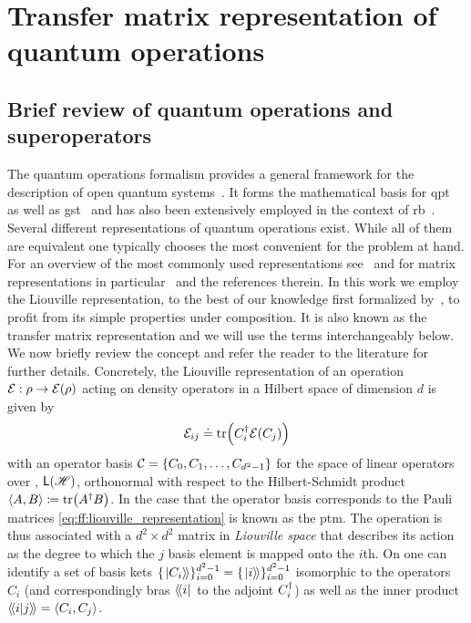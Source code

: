 \section{Transfer matrix representation of quantum operations}\label{sec:ff:theory:transfer_matrix}
\subsection{Brief review of quantum operations and superoperators}
The quantum operations formalism provides a general framework for the description of open quantum systems~\cite{Kraus1983,Nielsen2011}.
It forms the mathematical basis for \gls{qpt}~\cite{Chuang1997,Poyatos1997} as well as \gls{gst}~\cite{Blume-Kohout2013,Greenbaum2015} and has also been extensively employed in the context of \gls{rb}~\cite{Magesan2011,Kimmel2014}.
Several different representations of quantum operations exist.
While all of them are equivalent one typically chooses the most convenient for the problem at hand.
For an overview of the most commonly used representations see~ and for matrix representations in particular~ and the references therein.
In this work we employ the Liouville representation, to the best of our knowledge first formalized by~\citeauthor{Fano1957}, to profit from its simple properties under composition.
It is also known as the transfer matrix representation and we will use the terms interchangeably below.
We now briefly review the concept and refer the reader to the literature for further details.
Concretely, the Liouville representation of an operation $\mathcal{E}: \rho\rightarrow\mathcal{E}(\rho)$ acting on density operators in a Hilbert space \Hspace of dimension $d$ is given by
\begin{equation}\label{eq:ff:liouville_representation}
    \mathcal{E}_{ij}\doteq\tr(C_i^\dagger\mathcal{E}(C_j))
\end{equation}
with an operator basis $\mathcal{C}=\lbrace C_0, C_1, \dotsc, C_{d^2-1}\rbrace$ for the space of linear operators over \Hspace, $\mathsf{L}(\mathscr{H})$, orthonormal with respect to the Hilbert-Schmidt product $\expval{A,B}\coloneqq\tr(A^\dagger B)$.
In the case that the operator basis corresponds to the Pauli matrices \cref{eq:ff:liouville_representation} is known as the \gls{ptm}.
The operation \qp is thus associated with a $d^2\times d^2$ matrix in \emph{Liouville space} \Lspace that describes its action as the degree to which the $j$ basis element is mapped onto the $i$th.
On \Lspace one can identify a set of basis kets $\lbrace\mbox{\ensuremath{\left.\ket{C_i}\!\right\rangle}}\rbrace_{i=0}^{d^2-1} = \lbrace\mbox{\ensuremath{\left.\ket{i}\!\right\rangle}}\rbrace_{i=0}^{d^2-1}$ isomorphic to the operators $C_i$ (and correspondingly bras $\mbox{\ensuremath{\left\langle\!\bra{i}\right.}}$ to the adjoint $C_i^\dagger$) as well as the inner product $\mbox{\ensuremath{\left\langle\!\braket{i}{j}\!\right\rangle}} = \expval{C_i,C_j}$.
